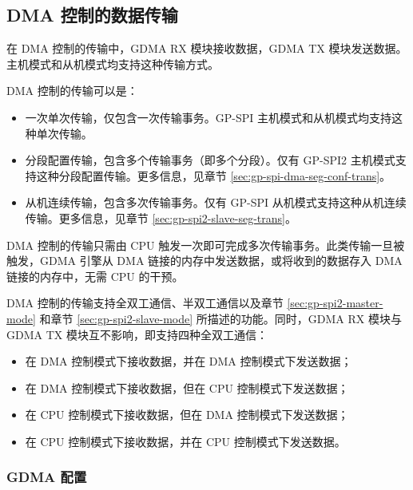 \documentclass[main\_\_CN.tex]{subfiles}
\begin{document}
\subsection{DMA 控制的数据传输}\label{sec:usage-of-gp-spi2-dma-controlled-mode}

在 DMA 控制的传输中，GDMA RX 模块接收数据，GDMA TX 模块发送数据。主机模式和从机模式均支持这种传输方式。

DMA 控制的传输可以是：

\begin{itemize}
    \item 一次单次传输，仅包含一次传输事务。GP-SPI 主机模式和从机模式均支持这种单次传输。
    \item 分段配置传输，包含多个传输事务（即多个分段）。仅有 GP-SPI2 主机模式支持这种分段配置传输。更多信息，见章节  \ref{sec:gp-spi-dma-seg-conf-trans}。
    \item 从机连续传输，包含多次传输事务。仅有 GP-SPI 从机模式支持这种从机连续传输。更多信息，见章节  \ref{sec:gp-spi2-slave-seg-trans}。
\end{itemize}

DMA 控制的传输只需由 CPU 触发一次即可完成多次传输事务。此类传输一旦被触发，GDMA 引擎从 DMA 链接的内存中发送数据，或将收到的数据存入 DMA 链接的内存中，无需 CPU 的干预。

DMA 控制的传输支持全双工通信、半双工通信以及章节  \ref{sec:gp-spi2-master-mode} 和章节  \ref{sec:gp-spi2-slave-mode} 所描述的功能。同时，GDMA RX 模块与 GDMA TX 模块互不影响，即支持四种全双工通信：

\begin{itemize}
    \item 在 DMA 控制模式下接收数据，并在 DMA 控制模式下发送数据；

    \item 在 DMA 控制模式下接收数据，但在 CPU 控制模式下发送数据；

    \item 在 CPU 控制模式下接收数据，但在 DMA 控制模式下发送数据；

    \item 在 CPU 控制模式下接收数据，并在 CPU 控制模式下发送数据。

\end{itemize}

\subsubsection{GDMA 配置}\label{sec:DMA-conf}
\end{document}
